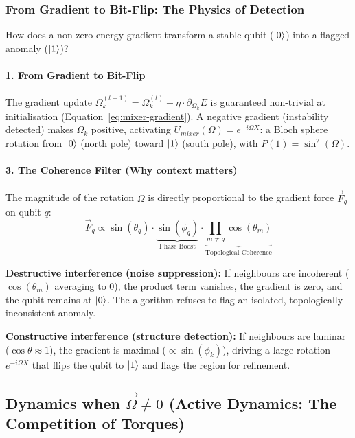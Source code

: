 \documentclass[12pt, a4paper, oneside]{report}
\begin{document}
\subsubsection{From Gradient to Bit-Flip: The Physics of Detection}
\label{sec:coherence-filter}
How does a non-zero energy gradient transform a stable qubit ($\ket{0}$) into a flagged anomaly ($\ket{1}$)?

\paragraph{1. From Gradient to Bit-Flip}
The gradient update $\Omega_k^{(t+1)} = \Omega_k^{(t)} - \eta \cdot \partial_{\Omega_k} E$ is guaranteed non-trivial at initialisation (Equation~\ref{eq:mixer-gradient}). A negative gradient (instability detected) makes $\Omega_k$ positive, activating $U_{mixer}(\Omega) = e^{-i\Omega X}$: a Bloch sphere rotation from $\ket{0}$ (north pole) toward $\ket{1}$ (south pole), with $P(1) = \sin^2(\Omega)$.

\begin{tcolorbox}
\paragraph{3. The Coherence Filter (Why context matters)}
The magnitude of the rotation $\Omega$ is directly proportional to the gradient force $\vec{F}_q$ on qubit $q$:
\begin{equation}
    \vec{F}_q \propto \sin(\theta_q)\cdot\underbrace{\sin(\phi_q)}_{\text{Phase Boost}} \cdot\underbrace{\prod_{m \neq q} \cos(\theta_m)}_{\text{Topological Coherence}}
\label{eq:gradient-force}
\end{equation}

\textbf{Destructive interference (noise suppression):} If neighbours are incoherent ($\cos(\theta_m)$ averaging to 0), the product term vanishes, the gradient is zero, and the qubit remains at $\ket{0}$. The algorithm refuses to flag an isolated, topologically inconsistent anomaly.

\textbf{Constructive interference (structure detection):} If neighbours are laminar ($\cos\theta \approx 1$), the gradient is maximal ($\propto \sin(\phi_k)$), driving a large rotation $e^{-i\Omega X}$ that flips the qubit to $\ket{1}$ and flags the region for refinement.
\end{tcolorbox}
\subsection{Dynamics when $\vec{\Omega} \neq 0$ (Active Dynamics: The Competition of Torques)}
\end{document}
